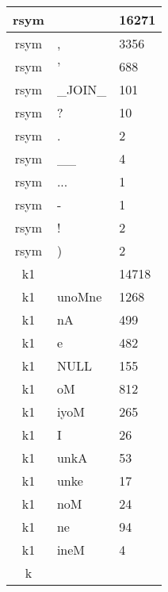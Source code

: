 \documentclass[a4 paper]{article}
\begin{document}
\begin{longtable}{cp{}p{}}
rsym &  & 16271\\ \midrule rsym & , & 3356\\ \midrule rsym & ' & 688\\ \midrule rsym & \_JOIN\_ & 101\\ \midrule rsym & ? & 10\\ \midrule rsym & . & 2\\ \midrule rsym & \_\_ & 4\\ \midrule rsym & ... & 1\\ \midrule rsym & - & 1\\ \midrule rsym & ! & 2\\ \midrule rsym & ) & 2\\ \midrule 
k1 &  & 14718\\ \midrule k1 & unoMne & 1268\\ \midrule k1 & nA & 499\\ \midrule k1 & e & 482\\ \midrule k1 & NULL & 155\\ \midrule k1 & oM & 812\\ \midrule k1 & iyoM & 265\\ \midrule k1 & I & 26\\ \midrule k1 & unkA & 53\\ \midrule k1 & unke & 17\\ \midrule k1 & noM & 24\\ \midrule k1 & ne & 94\\ \midrule k1 & ineM & 4\\ \midrule k
\end{longtable}
\end{document}
